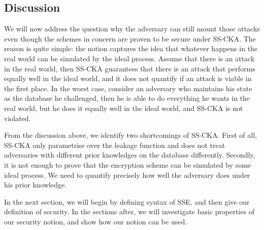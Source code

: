 \subsection{Discussion}
We will now address the question why the adversary can still mount those attacks even though the schemes in concern are proven to be secure under SS-CKA. The reason is quite simple: the notion captures the idea that whatever happens in the real world can be simulated by the ideal process. Assume that there is an attack in the real world, then SS-CKA guarantees that there is an attack that performs equally well in the ideal world, and it does not quantify if an attack is viable in the first place. In the worst case, consider an adversary who maintains his state as the database he challenged, then he is able to do everything he wants in the real world, but he does it equally well in the ideal world, and SS-CKA is not violated.

From the discussion above, we identify two shortcomings of SS-CKA. First of all, SS-CKA only parametrise over the leakage function and does not treat adversaries with different prior knowledges on the database differently. Secondly, it is not enough to prove that the encryption scheme can be simulated by some ideal process. We need to quantify precisely how well the adversary does under his prior knowledge.

In the next section, we will begin by defining syntax of SSE, and then give our definition of security. In the sections after, we will investigate basic properties of our security notion, and show how our notion can be used.